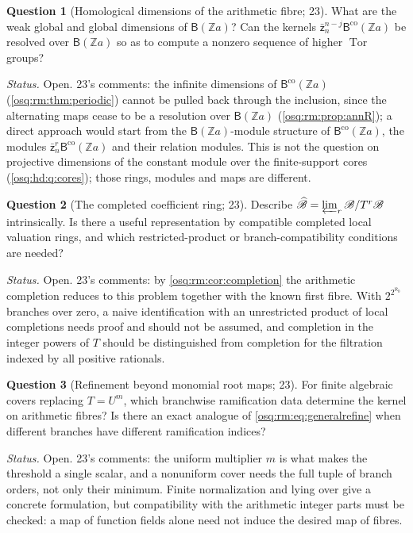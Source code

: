 \documentclass[11pt,letterpaper]{article}
\numberwithin{equation}{section}
\theoremstyle{definition}
\newtheorem{question}[question]{Question}
\theoremstyle{remark}
\theoremstyle{plain}
\newcommand{\Z}{\mathbb Z}
\newcommand{\Tor}{\operatorname{Tor}}
\begin{document}
\begin{question}[Homological dimensions of the arithmetic fibre; 23]\label{osq:rm:q:arhomology}
What are the weak global and global dimensions of $\mathsf B(\Z a)$? Can the kernels $\bar{\mathsf z}_n^{n-j}\mathsf B^{\mathrm{co}}(\Z a)$ be resolved
over $\mathsf B(\Z a)$ so as to compute a nonzero sequence of higher $\Tor$ groups?
\end{question}
\emph{Status.} Open. 23's comments: the infinite dimensions of $\mathsf B^{\mathrm{co}}(\Z a)$ (\cref{osq:rm:thm:periodic}) cannot be pulled back through the
inclusion, since the alternating maps cease to be a resolution over $\mathsf B(\Z a)$ (\cref{osq:rm:prop:annR}); a direct approach would start from
the $\mathsf B(\Z a)$-module structure of $\mathsf B^{\mathrm{co}}(\Z a)$, the modules $\bar{\mathsf z}_n^r\mathsf B^{\mathrm{co}}(\Z a)$ and their relation
modules. This is not the question on projective dimensions of the constant module over the finite-support cores (\cref{osq:hd:q:cores}); those
rings, modules and maps are different.

\begin{question}[The completed coefficient ring; 23]\label{osq:rm:q:completion}
Describe $\widehat{\mathscr B}=\varprojlim_r\mathscr B/T^r\mathscr B$ intrinsically. Is there a useful representation by compatible completed local
valuation rings, and which restricted-product or branch-compatibility conditions are needed?
\end{question}
\emph{Status.} Open. 23's comments: by \cref{osq:rm:cor:completion} the arithmetic completion reduces to this problem together with the known first
fibre. With $2^{2^{\aleph_0}}$ branches over zero, a naive identification with an unrestricted product of local completions needs proof and should
not be assumed, and completion in the integer powers of $T$ should be distinguished from completion for the filtration indexed by all positive
rationals.

\begin{question}[Refinement beyond monomial root maps; 23]\label{osq:rm:q:nonmonomial}
For finite algebraic covers replacing $T=U^m$, which branchwise ramification data determine the kernel on arithmetic fibres? Is there an exact
analogue of \eqref{osq:rm:eq:generalrefine} when different branches have different ramification indices?
\end{question}
\emph{Status.} Open. 23's comments: the uniform multiplier $m$ is what makes the threshold a single scalar, and a nonuniform cover needs the full tuple
of branch orders, not only their minimum. Finite normalization and lying over give a concrete formulation, but compatibility with the arithmetic
integer parts must be checked: a map of function fields alone need not induce the desired map of fibres.
\end{document}
